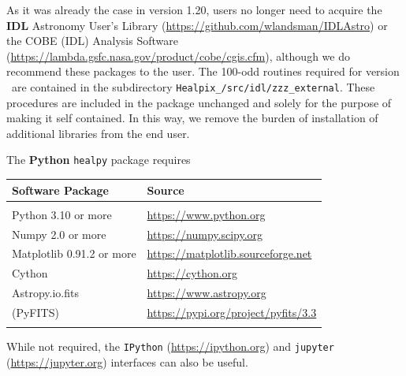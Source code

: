 \documentclass[12pt,twoside]{article}
\begin{document}
As it was already the case in version 1.20, users no longer need to acquire the
\textbf{IDL}
Astronomy User's Library
(\url{https://github.com/wlandsman/IDLAstro})
or the COBE (IDL) Analysis Software (\url{https://lambda.gsfc.nasa.gov/product/cobe/cgis.cfm}),
although we do recommend these packages to the user.
The 100-odd routines required for version \hpxversion\ are contained in the
subdirectory \texttt{Healpix\_\hpxversion/src/idl/zzz\_external}.
These procedures are included in the \healpix package unchanged and 
solely for the purpose of making it self contained. In this way,
we remove the burden of installation of additional libraries from 
the end user.

The  \textbf{Python} \texttt{healpy} package requires

\begin{tabular}{p{0.3\hsize} p{0.6\hsize}} \hline  
  \textbf{Software Package} & \textbf{Source} \\ \hline
                            &                          \\ %
Python 3.10 or more         & \url{https://www.python.org}
			\\
Numpy 2.0 or more         & \url{https://numpy.scipy.org}
			\\
Matplotlib 0.91.2 or more         & \url{https://matplotlib.sourceforge.net}
			\\
Cython 			& \url{https://cython.org}
			\\
Astropy.io.fits         & \url{https://www.astropy.org}
			\\
(PyFITS)         & \url{https://pypi.org/project/pyfits/3.3}
			\\
                                   &                          \\ \hline %
\end{tabular}\vspace{3ex}

While not required, the 
\texttt{IPython} (\url{https://ipython.org})
and
\texttt{jupyter} (\url{https://jupyter.org})
interfaces can also be useful.

%

\end{document}
